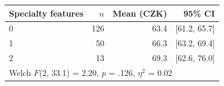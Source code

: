 \begin{tabular}{lrrr}
\toprule
Specialty features & $n$ & Mean (CZK) & 95\% CI \\
\midrule
0 & 126 & 63.4 & [61.2, 65.7] \\
1 &  50 & 66.3 & [63.2, 69.4] \\
2 &  13 & 69.3 & [62.6, 76.0] \\
\midrule
\multicolumn{4}{l}{Welch $F$(2, 33.1) = 2.20, $p$ = .126, $\eta^2$ = 0.02} \\
\bottomrule
\end{tabular}
